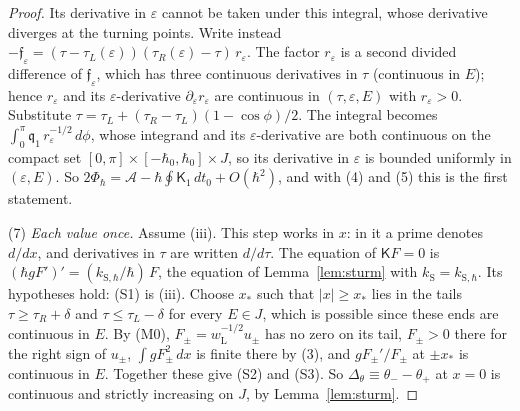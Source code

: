 \documentclass[aps,prd,onecolumn,tightenlines,nofootinbib,notitlepage,11pt,floatfix]{revtex4-2}
\theoremstyle{indentedtheorem}
\begin{document}
\begin{proof}
Its derivative in $\varepsilon$ cannot be taken under this integral, whose derivative diverges at the turning points. Write instead $-\mathfrak{f}_\varepsilon=(\tau-\tau_L(\varepsilon))(\tau_R(\varepsilon)-\tau)\,r_\varepsilon$. The factor $r_\varepsilon$ is a second divided difference of $\mathfrak{f}_\varepsilon$, which has three continuous derivatives in $\tau$ (continuous in $E$); hence $r_\varepsilon$ and its $\varepsilon$-derivative $\partial_\varepsilon r_\varepsilon$ are continuous in $(\tau,\varepsilon,E)$ with $r_\varepsilon>0$. Substitute $\tau=\tau_L+(\tau_R-\tau_L)(1-\cos\phi)/2$. The integral becomes $\int_0^\pi\mathfrak{q}_1\,r_\varepsilon^{-1/2}\,d\phi$, whose integrand and its $\varepsilon$-derivative are both continuous on the compact set $[0,\pi]\times[-\hbar_0,\hbar_0]\times J$, so its derivative in $\varepsilon$ is bounded uniformly in $(\varepsilon,E)$. So $2\Phi_\hbar=\mathcal{A}-\hbar\oint\mathsf{K}_1\,dt_0+O(\hbar^2)$, and with (4) and (5) this is the first statement.

(7) \emph{Each value once.} Assume (iii). This step works in $x$: in it a prime denotes $d/dx$, and derivatives in $\tau$ are written $d/d\tau$. The equation of $\mathsf{K}F=0$ is $(\hbar gF')'=(k_{\text{S},\hbar}/\hbar)\,F$, the equation of Lemma~\ref{lem:sturm} with $k_\text{S}=k_{\text{S},\hbar}$. Its hypotheses hold: (S1) is (iii). Choose $x_*$ such that $|x|\geq x_*$ lies in the tails $\tau\geq\tau_R+\delta$ and $\tau\leq\tau_L-\delta$ for every $E\in J$, which is possible since these ends are continuous in $E$. By (M0), $F_\pm=w_\text{L}^{-1/2}u_\pm$ has no zero on its tail, $F_\pm>0$ there for the right sign of $u_\pm$, $\int gF_\pm^2\,dx$ is finite there by (3), and $gF_\pm'/F_\pm$ at $\pm x_*$ is continuous in $E$. Together these give (S2) and (S3). So $\Delta_\theta\equiv\theta_--\theta_+$ at $x=0$ is continuous and strictly increasing on $J$, by Lemma~\ref{lem:sturm}.


\end{proof}
\end{document}

